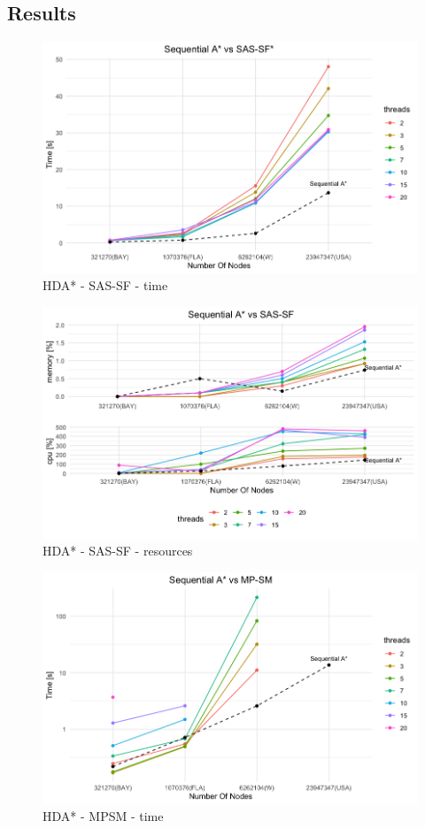 \documentclass[twocolumn, switch]{article} %
\begin{document}
\subsection{Results}
\begin{figure}[ht!]
  \centering
  \includegraphics[width=1\linewidth]{hda/seq_sf_time.png}
  \caption{HDA* - SAS-SF - time}
  \label{hdabaysassftime}
\end{figure}
\begin{figure}[ht!]
  \centering
  \includegraphics[width=1\linewidth]{hda/seq_sf_cpumem.png}
  \caption{HDA* - SAS-SF - resources}
  \label{hdabaysassfcpumem}
\end{figure}
\begin{figure}[ht!]
  \centering
  \includegraphics[width=1\linewidth]{hda/seq_mpsm_time.png}
  \caption{HDA* - MPSM - time}
  \label{hdabaympsmtime}
\end{figure}
\end{document}
